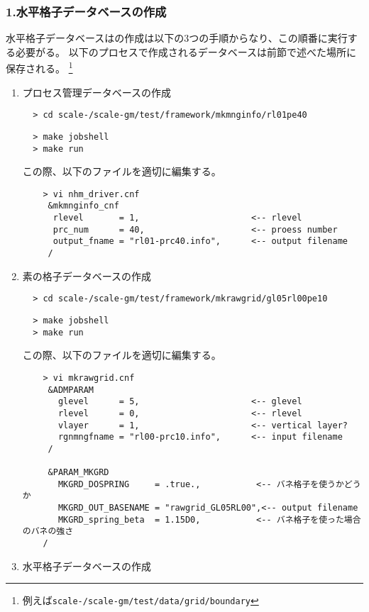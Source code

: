 \subsubsection{1.水平格子データベースの作成}
水平格子データベースはの作成は以下の3つの手順からなり、この順番に実行する必要がる。
以下のプロセスで作成されるデータベースは前節で述べた場所に保存される。
\footnote{例えば\texttt{scale-{\version}/scale-gm/test/data/grid/boundary}}
\renewcommand{\labelenumi}{(\roman{enumi})}
\begin{enumerate}

\item{プロセス管理データベースの作成}

\verb|  > cd scale-|{\version}\verb|/scale-gm/test/framework/mkmnginfo/rl01pe40|
\vspace{-4mm}
\begin{verbatim}
  > make jobshell
  > make run
\end{verbatim}
 この際、以下のファイルを適切に編集する。
 \begin{verbatim}
    > vi nhm_driver.cnf
     &mkmnginfo_cnf
      rlevel       = 1,                      <-- rlevel
      prc_num      = 40,                     <-- proess number
      output_fname = "rl01-prc40.info",      <-- output filename
     /
 \end{verbatim}

\item{素の格子データベースの作成}

\verb|  > cd scale-|{\version}\verb|/scale-gm/test/framework/mkrawgrid/gl05rl00pe10|
\vspace{-4mm}
\begin{verbatim}
  > make jobshell
  > make run
\end{verbatim}
 この際、以下のファイルを適切に編集する。
 \begin{verbatim}
    > vi mkrawgrid.cnf
     &ADMPARAM
       glevel      = 5,                      <-- glevel
       rlevel      = 0,                      <-- rlevel
       vlayer      = 1,                      <-- vertical layer?
       rgnmngfname = "rl00-prc10.info",      <-- input filename
     /

     &PARAM_MKGRD
       MKGRD_DOSPRING     = .true.,           <-- バネ格子を使うかどうか
       MKGRD_OUT_BASENAME = "rawgrid_GL05RL00",<-- output filename
       MKGRD_spring_beta  = 1.15D0,           <-- バネ格子を使った場合のバネの強さ
    /
 \end{verbatim}


\item{水平格子データベースの作成}


\end{enumerate}
